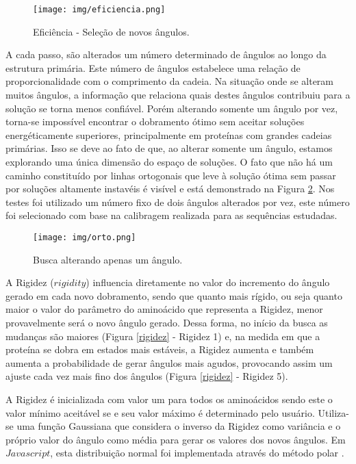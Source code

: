 \documentclass[dm,ppgcomp]{texfurg}
\begin{document}
\begin{figure}[htbp]
  \centering \texttt{[image: img/eficiencia.png]}
\caption{Eficiência - Seleção de novos ângulos.} 
\label{eficiencia}
\end{figure}

A cada passo, são alterados um número determinado de ângulos ao longo da estrutura primária. Este número de ângulos estabelece uma relação de proporcionalidade com o comprimento da cadeia. Na situação onde se alteram muitos ângulos, a informação que relaciona quais destes ângulos contribuiu para a solução se torna menos confiável. Porém alterando somente um ângulo por vez, torna-se impossível encontrar o dobramento ótimo sem aceitar soluções energéticamente superiores, principalmente em proteínas com grandes cadeias primárias. Isso se deve ao fato de que, ao alterar somente um ângulo, estamos explorando uma única dimensão do espaço de soluções. O fato que não há um caminho constituído por linhas ortogonais que leve à solução ótima sem passar por soluções altamente instavéis é visível e está demonstrado na Figura \ref{orto}. Nos testes foi utilizado um número fixo de dois ângulos alterados por vez, este número foi selecionado com base na calibragem realizada para as sequências estudadas.

\begin{figure}[htbp]
  \centering \texttt{[image: img/orto.png]}
\caption{Busca alterando apenas um ângulo.} 
\label{orto}
\end{figure}

A Rigidez ($rigidity$) influencia diretamente no valor do incremento do ângulo gerado em cada novo dobramento, sendo que quanto mais rígido, ou seja quanto maior o valor do parâmetro do aminoácido que representa a Rigidez, menor provavelmente será o novo ângulo gerado. Dessa forma, no início da busca as mudanças são maiores (Figura \ref{rigidez} - Rigidez 1) e, na medida em que a proteína se dobra em estados mais estáveis, a Rigidez aumenta e também aumenta a probabilidade de gerar ângulos mais agudos, provocando assim um ajuste cada vez mais fino dos ângulos (Figura \ref{rigidez} - Rigidez 5). 

A Rigidez é inicializada com valor um para todos os aminoácidos sendo este o valor mínimo aceitável se e seu valor máximo é determinado pelo usuário. Utiliza-se uma função Gaussiana que considera o inverso da Rigidez como variância e o próprio valor do ângulo como média para gerar os valores dos novos ângulos. Em $Javascript$, esta distribuição normal foi implementada através do método polar \cite{sheldon2002first} .
\end{document}
